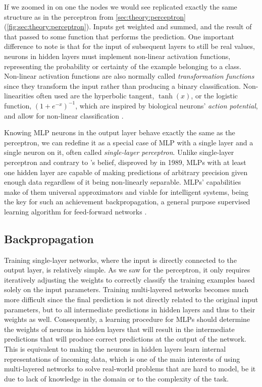 If we zoomed in on one the nodes we would see replicated exactly the same structure as in the perceptron from \autoref{sec:theory:perceptron} (\autoref{fig:sec:theory:perceptron}).
Inputs get weighted and summed, and the result of that passed to some function that performs the prediction.
One important difference to note is that for the input of subsequent layers to still be real values, neurons in hidden layers must implement non-linear activation functions, representing the probability or certainty of the example belonging to a class.
Non-linear activation functions are also normally called \emph{transformation functions} since they transform the input rather than producing a binary classification.
Non-linearities often used are the hyperbolic tangent, $\tanh(x)$, or the logistic function, $(1+e^{-x})^{-1}$, which are inspired by biological neurons' \emph{action potential}, and allow for non-linear classification \cite{Thorpe1989}.

Knowing MLP neurons in the output layer behave exactly the same as the perceptron, we can redefine it as a special case of MLP with a single layer and a single neuron on it, often called \emph{single-layer perceptron}.
Unlike single-layer perceptron and contrary to \citeauthor{Minsky1969}'s belief, disproved by \citet{Hornik1989} in 1989, MLPs with at least one hidden layer are capable of making predictions of arbitrary precision given enough data regardless of it being non-linearly separable.
MLPs' capabilities make of them universal approximators and viable for intelligent systems, being the key for such an achievement backpropagation, a general purpose supervised learning algorithm for feed-forward networks \cite{Rumelhart1986}.


\subsection{Backpropagation}
\label{sec:theory:mlp:backpropagation}

Training single-layer networks, where the input is directly connected to the output layer, is relatively simple.
As we saw for the perceptron, it only requires iteratively adjusting the weights to correctly classify the training examples based solely on the input parameters.
Training multi-layered networks becomes much more difficult since the final prediction is not directly related to the original input parameters, but to all intermediate predictions in hidden layers and thus to their weights as well.
Consequently, a learning procedure for MLPs should determine the weights of neurons in hidden layers that will result in the intermediate predictions that will produce correct predictions at the output of the network.
This is equivalent to making the neurons in hidden layers learn internal representations of incoming data, which is one of the main interests of using multi-layered networks to solve real-world problems that are hard to model, be it due to lack of knowledge in the domain or to the complexity of the task.

